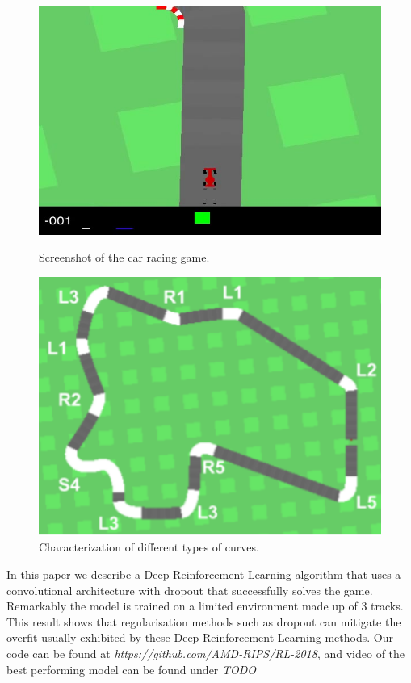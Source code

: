 \documentclass{article}
\begin{document}
\begin{figure}[!h]
\captionsetup{justification=centering}
\centering
\begin{minipage}{.4\textwidth}
  \centering
  \includegraphics[width=\linewidth]{carracing.jpg}
  \caption{Screenshot of the car racing game. }
  \label{fig:carracing}
\end{minipage}
\hspace{1cm}
\begin{minipage}{.4\textwidth}
  \centering
  \includegraphics[width=\linewidth]{curve_characterization.png}
  \caption{Characterization of different types of curves. }
  \label{fig:curves}
\end{minipage}
\end{figure}

In this paper we describe a Deep Reinforcement Learning algorithm that uses a convolutional architecture with dropout that 
successfully solves the game. Remarkably the model is trained on a limited environment made up of 3 tracks. This result 
shows that regularisation methods such as dropout can mitigate the overfit usually exhibited by these Deep Reinforcement Learning methods. Our code can be found at \textit{https://github.com/AMD-RIPS/RL-2018}, and video of the best performing model can be found under \textit{TODO}
\end{document}
